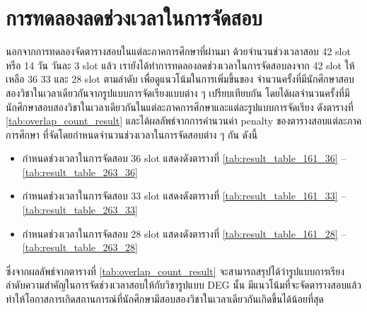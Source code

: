 \section{การทดลองลดช่วงเวลาในการจัดสอบ}
นอกจากการทดลองจัดตารางสอบในแต่ละภาคการศึกษาที่ผ่านมา ด้วยจำนวนช่วงเวลาสอบ 42 slot หรือ 14 วัน วันละ 3 slot แล้ว
เรายังได้ทำการทดลองลดช่วงเวลาในการจัดสอบลงจาก 42 slot ให้เหลือ 36 33 และ 28 slot ตามลำดับ
เพื่อดูแนวโน้มในการเพิ่มขึ้นของ จำนวนครั้งที่มีนักศึกษาสอบสองวิชาในเวลาเดียวกันจากรูปแบบการจัดเรียงแบบต่าง ๆ เปรียบเทียบกัน
โดยได้ผลจำนวนครั้งที่มีนักศึกษาสอบสองวิชาในเวลาเดียวกันในแต่ละภาคการศึกษาและแต่ละรูปแบบการจัดเรียง ดังตารางที่ \ref{tab:overlap_count_result}
และได้ผลลัพธ์จากการคำนวนค่า penalty ของตารางสอบแต่ละภาคการศึกษา ที่จัดโดยกำหนดจำนวนช่วงเวลาในการจัดสอบต่าง ๆ กัน ดังนี้
\begin{itemize}
    \item กำหนดช่วงเวลาในการจัดสอบ 36 slot แสดงดังตารางที่ \ref{tab:result_table_161_36} -- \ref{tab:result_table_263_36}
    \item กำหนดช่วงเวลาในการจัดสอบ 33 slot แสดงดังตารางที่ \ref{tab:result_table_161_33} -- \ref{tab:result_table_263_33}
    \item กำหนดช่วงเวลาในการจัดสอบ 28 slot แสดงดังตารางที่ \ref{tab:result_table_161_28} -- \ref{tab:result_table_263_28}
\end{itemize}
ซึ่งจากผลลัพธ์จากตารางที่ \ref{tab:overlap_count_result} จะสามารถสรุปได้ว่ารูปแบบการเรียงลำดับความสำคัญในการจัดช่วงเวลาสอบให้กับวิชารูปแบบ DEG นั้น 
มีแนวโน้มที่จะจัดตารางสอบแล้วทำให้โอกาสการเกิดสถานการณ์ที่นักศึกษามีสอบสองวิชาในเวลาเดียวกันเกิดขึ้นได้น้อยที่สุด
